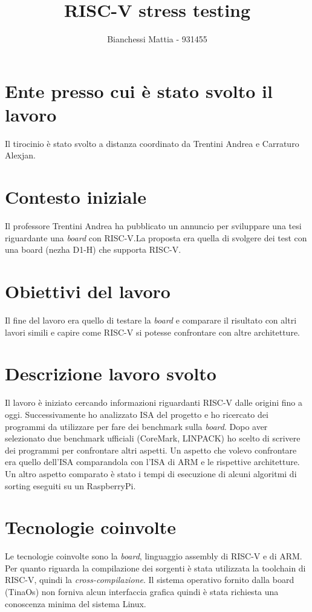 \documentclass[10pt]{article}
\title{RISC-V stress testing}
\author{Bianchessi Mattia - 931455}
\date{}
\begin{document}
\maketitle

\section{ Ente presso cui è stato svolto il lavoro}
Il tirocinio è stato svolto a distanza coordinato da Trentini Andrea e Carraturo Alexjan.

\section{Contesto iniziale}
Il professore Trentini Andrea ha pubblicato un annuncio per sviluppare una tesi riguardante una \textit{board} con RISC-V.La proposta era quella di svolgere dei test con una board (nezha D1-H) che supporta RISC-V.

\section{Obiettivi del lavoro}
Il fine del lavoro era quello di testare la \textit{board} e comparare il risultato con altri lavori simili e capire come RISC-V si potesse confrontare con altre architetture.

\section{Descrizione lavoro svolto}
Il lavoro è iniziato cercando informazioni riguardanti RISC-V dalle origini fino a oggi. Successivamente ho analizzato ISA del progetto e ho ricercato dei programmi da utilizzare per fare dei benchmark sulla \textit{board}. Dopo aver selezionato due benchmark ufficiali (CoreMark, LINPACK) ho scelto di scrivere dei programmi per confrontare altri aspetti.
Un aspetto che volevo confrontare era quello dell'ISA comparandola con l'ISA di ARM e le rispettive architetture. Un altro aspetto comparato è stato i tempi di esecuzione di alcuni algoritmi di sorting eseguiti su un RaspberryPi.


\section{Tecnologie coinvolte }
Le tecnologie coinvolte sono la \textit{board}, linguaggio assembly di RISC-V e di ARM.
Per quanto riguarda la compilazione dei sorgenti è stata utilizzata la toolchain di RISC-V, quindi la \textit{cross-compilazione}. Il sistema operativo fornito dalla board (TinaOs) non forniva alcun interfaccia grafica quindi è stata richiesta una conoscenza minima del sistema Linux.
\end{document}
